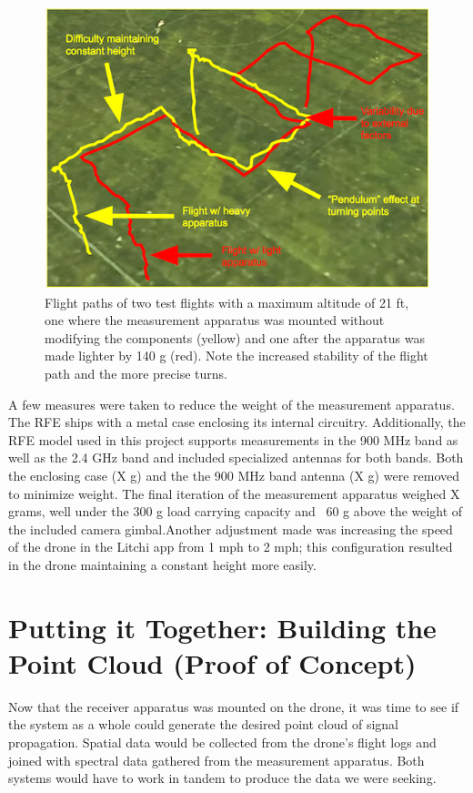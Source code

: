 \documentclass[pageno]{jpaper}
\begin{document}
 \begin{figure}[h]
 	\caption{Flight paths of two test flights with a maximum altitude of 21 ft, one where the measurement apparatus was mounted without modifying the components (yellow) and one after the apparatus was made lighter by 140 g (red). Note the increased stability of the flight path and the more precise turns. }
 	\includegraphics{performance_comparison}
 	\centering
 \end{figure}
 
 A few measures were taken to reduce the weight of the measurement apparatus. The RFE ships with a metal case enclosing its internal circuitry. Additionally, the RFE model used in this project supports measurements in the 900 MHz band as well as the 2.4 GHz band and included specialized antennas for both bands. Both the enclosing case (X g) and the the 900 MHz band antenna (X g) were removed to minimize weight. The final iteration of the measurement apparatus weighed X grams, well under the 300 g load carrying capacity and ~60 g above the weight of the included camera gimbal.Another adjustment made was increasing the speed of the drone in the Litchi app from 1 mph to 2 mph; this configuration resulted in the drone maintaining a constant height more easily.
 
 \section{Putting it Together: Building the Point Cloud (Proof of Concept)}
Now that the receiver apparatus was mounted on the drone, it was time to see if the system as a whole could generate the desired point cloud of signal propagation. Spatial data would be collected from the drone's flight logs and joined with spectral data gathered from the measurement apparatus. Both systems would have to work in tandem to produce the data we were seeking. 
\end{document}
